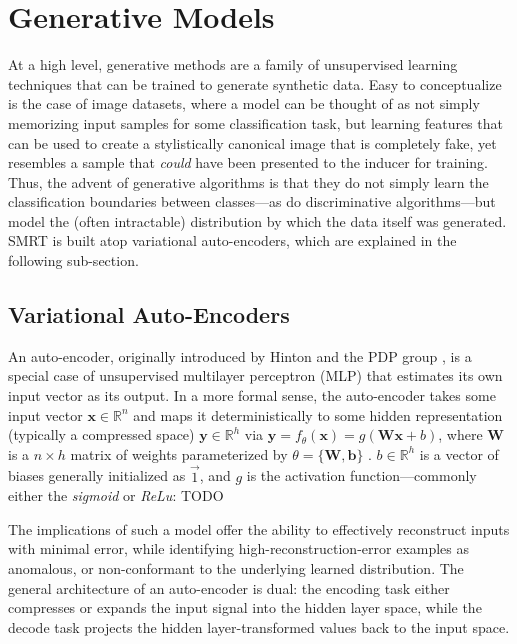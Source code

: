 \documentclass[twoside,11pt]{article}
\begin{document}
\section{Generative Models}

At a high level, generative methods are a family of unsupervised learning techniques that can be trained to generate synthetic data. Easy to conceptualize is the case of image datasets, where a model can be thought of as not simply memorizing input samples for some classification task, but learning features that can be used to create a stylistically canonical image that is completely fake, yet resembles a sample that \emph{could} have been presented to the inducer for training. Thus, the advent of generative algorithms is that they do not simply learn the classification boundaries between classes---as do discriminative algorithms---but model the (often intractable) distribution by which the data itself was generated. SMRT is built atop variational auto-encoders, which are explained in the following sub-section.

\subsection{Variational Auto-Encoders}

An auto-encoder, originally introduced by Hinton and the PDP group \citep{rumelhart1985learning}, is a special case of unsupervised multilayer perceptron (MLP) that estimates its own input vector as its output. In a more formal sense, the auto-encoder takes some input vector $\mathbf{x} \in  \mathbb{R}^{n}$ and maps it deterministically to some hidden representation (typically a compressed space) $\mathbf{y} \in  \mathbb{R}^{h}$ via $\mathbf{y} = f_{\theta}(\mathbf{x}) = g(\mathbf{Wx} + b)$, where $\mathbf{W}$ is a $n \times h$ matrix of weights parameterized by $\theta = \{\mathbf{W, b}\}$ \citep{meyer2015introduction}. $b \in \mathbb{R}^{h}$ is a vector of biases generally initialized as $\vec{1}$, and $g$ is the activation function---commonly either the \emph{sigmoid} or \emph{ReLu}: TODO

The implications of such a model offer the ability to effectively reconstruct inputs with minimal error, while identifying high-reconstruction-error examples as anomalous, or non-conformant to the underlying learned distribution. The general architecture of an auto-encoder is dual: the encoding task either compresses or expands the input signal into the hidden layer space, while the decode task projects the hidden layer-transformed values back to the input space.
\end{document}
